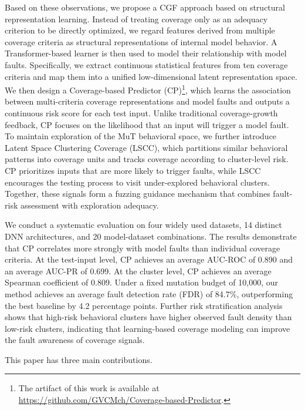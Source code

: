 \documentclass[preprint,number,5p,twocolumn]{elsarticle}
\begin{document}
\par Based on these observations, we propose a CGF approach based on structural representation learning. Instead of treating coverage only as an adequacy criterion to be directly optimized, we regard features derived from multiple coverage criteria as structural representations of internal model behavior. A Transformer-based learner is then used to model their relationship with model faults. Specifically, we extract continuous statistical features from ten coverage criteria and map them into a unified low-dimensional latent representation space. We then design a Coverage-based Predictor (CP)\footnote{The artifact of this work is available at \url{https://github.com/GVCMch/Coverage-based-Predictor}.}, which learns the association between multi-criteria coverage representations and model faults and outputs a continuous risk score for each test input. Unlike traditional coverage-growth feedback, CP focuses on the likelihood that an input will trigger a model fault. To maintain exploration of the MuT behavioral space, we further introduce Latent Space Clustering Coverage (LSCC), which partitions similar behavioral patterns into coverage units and tracks coverage according to cluster-level risk. CP prioritizes inputs that are more likely to trigger faults, while LSCC encourages the testing process to visit under-explored behavioral clusters. Together, these signals form a fuzzing guidance mechanism that combines fault-risk assessment with exploration adequacy.

\par We conduct a systematic evaluation on four widely used datasets, 14 distinct DNN architectures, and 20 model-dataset combinations. The results demonstrate that CP correlates more strongly with model faults than individual coverage criteria. At the test-input level, CP achieves an average AUC-ROC of 0.890 and an average AUC-PR of 0.699. At the cluster level, CP achieves an average Spearman coefficient of 0.809. Under a fixed mutation budget of 10,000, our method achieves an average fault detection rate (FDR) of 84.7\%, outperforming the best baseline by 4.2 percentage points. Further risk stratification analysis shows that high-risk behavioral clusters have higher observed fault density than low-risk clusters, indicating that learning-based coverage modeling can improve the fault awareness of coverage signals.

This paper has three main contributions.
\end{document}

